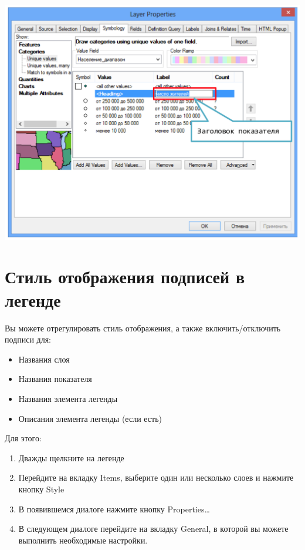 \documentclass[]{book}
\theoremstyle{definition}
\theoremstyle{definition}
\theoremstyle{definition}
\theoremstyle{remark}
\begin{document}
\includegraphics{images/Appendix/image58.png}

\hypertarget{----}{%
\section{Стиль отображения подписей в легенде}\label{----}}

Вы можете отрегулировать стиль отображения, а также включить/отключить
подписи для:

\begin{itemize}
\item
  Названия слоя
\item
  Названия показателя
\item
  Названия элемента легенды
\item
  Описания элемента легенды (если есть)
\end{itemize}

Для этого:

\begin{enumerate}
\def\labelenumi{\arabic{enumi}.}
\item
  Дважды щелкните на легенде
\item
  Перейдите на вкладку Items, выберите один или несколько слоев и
  нажмите кнопку Style
\item
  В появившемся диалоге нажмите кнопку Properties\ldots{}
\item
  В следующем диалоге перейдите на вкладку General, в которой вы можете
  выполнить необходимые настройки.
\end{enumerate}
\end{document}
